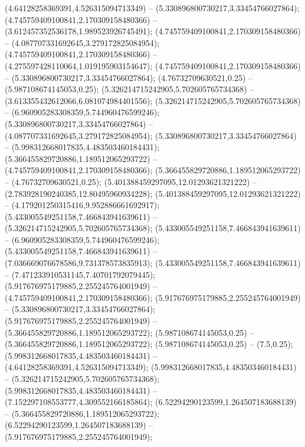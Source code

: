  (4.64128258369391,4.526315094713349) -- (5.330896800730217,3.33454766027864);
 (4.745759409100841,2.170309158480366) -- (3.612457352536178,1.989523926745491);
 (4.745759409100841,2.170309158480366) -- (4.087707331692645,3.279172825084954);
 (4.745759409100841,2.170309158480366) -- (4.275597428110064,1.019195903154647);
 (4.745759409100841,2.170309158480366) -- (5.330896800730217,3.33454766027864);
 (4.76732709630521,0.25) -- (5.987108674145053,0.25);
 (5.326214715242905,5.702605765734368) -- (3.613355432612066,6.081074984401556);
 (5.326214715242905,5.702605765734368) -- (6.960905283308359,5.744960476599246);
 (5.330896800730217,3.33454766027864) -- (4.087707331692645,3.279172825084954);
 (5.330896800730217,3.33454766027864) -- (5.998312668017835,4.483503460184431);
 (5.366455829720886,1.189512065293722) -- (4.745759409100841,2.170309158480366);
 (5.366455829720886,1.189512065293722) -- (4.76732709630521,0.25);
 (5.401388459297095,12.01293621321222) -- (2.783928190240385,12.80495960934228);
 (5.401388459297095,12.01293621321222) -- (4.179201250315416,9.952886661692917);
 (5.433005549251158,7.466843941639611) -- (5.326214715242905,5.702605765734368);
 (5.433005549251158,7.466843941639611) -- (6.960905283308359,5.744960476599246);
 (5.433005549251158,7.466843941639611) -- (7.036669076678586,9.731378573835913);
 (5.433005549251158,7.466843941639611) -- (7.471233910531145,7.40701792079445);
 (5.917676975179885,2.255245764001949) -- (4.745759409100841,2.170309158480366);
 (5.917676975179885,2.255245764001949) -- (5.330896800730217,3.33454766027864);
 (5.917676975179885,2.255245764001949) -- (5.366455829720886,1.189512065293722);
 (5.987108674145053,0.25) -- (5.366455829720886,1.189512065293722);
 (5.987108674145053,0.25) -- (7.5,0.25);
 (5.998312668017835,4.483503460184431) -- (4.64128258369391,4.526315094713349);
 (5.998312668017835,4.483503460184431) -- (5.326214715242905,5.702605765734368);
 (5.998312668017835,4.483503460184431) -- (7.152297108553777,4.309552166185864);
 (6.52294290123599,1.264507183688139) -- (5.366455829720886,1.189512065293722);
 (6.52294290123599,1.264507183688139) -- (5.917676975179885,2.255245764001949);
